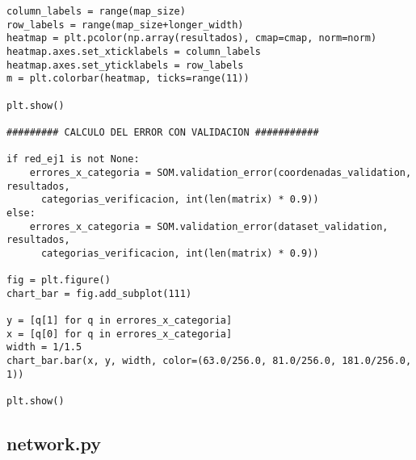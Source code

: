 \begin{changemargin}{-2.0cm}{-1.5cm}
\begin{verbatim}
column_labels = range(map_size)
row_labels = range(map_size+longer_width)
heatmap = plt.pcolor(np.array(resultados), cmap=cmap, norm=norm)
heatmap.axes.set_xticklabels = column_labels
heatmap.axes.set_yticklabels = row_labels
m = plt.colorbar(heatmap, ticks=range(11))

plt.show()

######### CALCULO DEL ERROR CON VALIDACION ###########

if red_ej1 is not None:
    errores_x_categoria = SOM.validation_error(coordenadas_validation, resultados, 
      categorias_verificacion, int(len(matrix) * 0.9))
else:
    errores_x_categoria = SOM.validation_error(dataset_validation, resultados, 
      categorias_verificacion, int(len(matrix) * 0.9))

fig = plt.figure()
chart_bar = fig.add_subplot(111)

y = [q[1] for q in errores_x_categoria]
x = [q[0] for q in errores_x_categoria]
width = 1/1.5
chart_bar.bar(x, y, width, color=(63.0/256.0, 81.0/256.0, 181.0/256.0, 1))

plt.show()
\end{verbatim}
\end{changemargin}

\newpage
\subsection{network.py}

